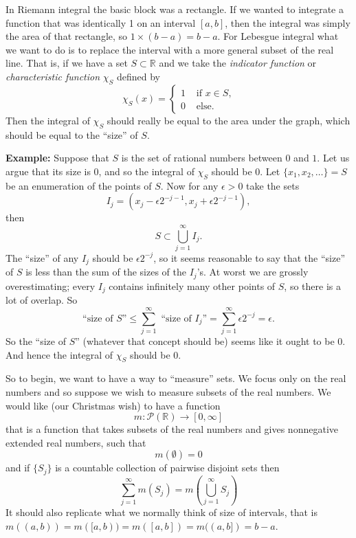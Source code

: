 \documentclass[12pt]{book}
\newcommand{\R}{{\mathbb{R}}}
\newcommand{\sP}{{\mathcal{P}}}
\theoremstyle{plain}
\theoremstyle{remark}
\theoremstyle{definition}
\theoremstyle{exercise}
\theoremstyle{example}
\begin{document}
\medskip

In Riemann integral the basic block was a rectangle.  If we wanted to
integrate a function that was identically 1 on an interval $[a,b]$, then the
integral was simply the area of that rectangle, so $1 \times (b-a) = b-a$.
For Lebesgue integral what we want to do is to replace the interval with a
more general subset of the real line.  That is, if we have a set $S \subset
\R$ and we take the \emph{indicator function} or \emph{characteristic
function} $\chi_S$ defined by
$$
\chi_S (x) =
\begin{cases}
1 & \text{ if $x \in S$,} \\
0 & \text{ else.}
\end{cases}
$$
Then the integral of $\chi_S$ should really be equal to the area under the
graph, which should be equal to the ``size'' of $S$.

\medskip

\textbf{Example:}
Suppose that $S$ is the set of rational numbers between $0$ and $1$.  Let us
argue that its size is 0, and so the integral of $\chi_S$ should be 0.
Let $\{ x_1, x_2, \ldots \} = S$ be an enumeration
of the points of $S$.  Now for any $\epsilon > 0$
take the sets
$$I_j = (x_j - \epsilon 2^{-j-1}, 
x_j + \epsilon 2^{-j-1}),$$
then
$$
S \subset \bigcup_{j=1}^\infty I_j .
$$
The ``size'' of any $I_j$ should be $\epsilon 2^{-j}$, so it seems reasonable
to say that the ``size'' of $S$ is less than the sum of the sizes of the $I_j$'s.
At worst we are grossly overestimating; every $I_j$ contains
infinitely
many other points of $S$, so there is a lot of overlap.  So
$$
\text{``size of $S$''} \leq
\sum_{j=1}^\infty \text{ ``size of $I_j$''} =
\sum_{j=1}^\infty \epsilon 2^{-j} = \epsilon.
$$
So the ``size of $S$'' (whatever that concept should be) seems like it ought
to be 0.  And hence the integral of $\chi_S$ should be 0.

\medskip

So to begin, we want to have a way to ``measure'' sets.  We focus
only on the real numbers and so suppose we wish to measure subsets of the real
numbers.  We would like (our Christmas wish) to have a function
$$
m \colon \sP(\R) \to [0,\infty]
$$
that is a function that takes subsets of the real numbers
and gives nonnegative extended real numbers, such that 
$$
m(\emptyset) = 0
$$
and if $\{ S_j \}$ is a countable collection of pairwise disjoint sets then
$$
\sum_{j=1}^\infty m(S_j) = m\left( \bigcup_{j=1}^\infty S_j \right)
$$
It should also replicate what we normally think of size of intervals,
that is $m( (a,b) ) = m([a,b) ) = m([a,b]) = m((a,b]) = b-a$.
\end{document}
